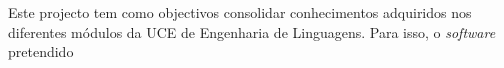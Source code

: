 Este projecto tem como objectivos consolidar conhecimentos adquiridos nos diferentes módulos da UCE de Engenharia de Linguagens. Para isso, o \emph{software} pretendido 
